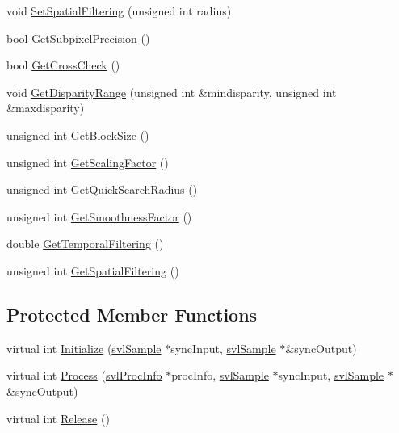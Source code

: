 \begin{DoxyCompactItemize}
\item 
void \hyperlink{classsvl_filter_computational_stereo_a1ff93f158c15c75f9bdbfbe3fc7f839f}{Set\-Spatial\-Filtering} (unsigned int radius)
\item 
bool \hyperlink{classsvl_filter_computational_stereo_a99fd778eca713298174b6de0b895472a}{Get\-Subpixel\-Precision} ()
\item 
bool \hyperlink{classsvl_filter_computational_stereo_a92734e4aeaefd2ac7555f193266c1c24}{Get\-Cross\-Check} ()
\item 
void \hyperlink{classsvl_filter_computational_stereo_a8a5e5d255fea88bb63a1e0f97671506f}{Get\-Disparity\-Range} (unsigned int \&mindisparity, unsigned int \&maxdisparity)
\item 
unsigned int \hyperlink{classsvl_filter_computational_stereo_a7e16047fd86e63abff87eac0b97cae89}{Get\-Block\-Size} ()
\item 
unsigned int \hyperlink{classsvl_filter_computational_stereo_a6028560c488697bf211a293d25e08911}{Get\-Scaling\-Factor} ()
\item 
unsigned int \hyperlink{classsvl_filter_computational_stereo_a965355a595658463d900756c73d88df4}{Get\-Quick\-Search\-Radius} ()
\item 
unsigned int \hyperlink{classsvl_filter_computational_stereo_a48a1b020a3bc04bd71fdc8fcb34b7748}{Get\-Smoothness\-Factor} ()
\item 
double \hyperlink{classsvl_filter_computational_stereo_a4cbc718032c81abe02fd8b8e81098750}{Get\-Temporal\-Filtering} ()
\item 
unsigned int \hyperlink{classsvl_filter_computational_stereo_ab59410ceb3d767f1f191edfed777bd30}{Get\-Spatial\-Filtering} ()
\end{DoxyCompactItemize}
\subsection*{Protected Member Functions}
\begin{DoxyCompactItemize}
\item 
virtual int \hyperlink{classsvl_filter_computational_stereo_a7f1dc5d6963c9dd69d8b99e672162909}{Initialize} (\hyperlink{classsvl_sample}{svl\-Sample} $\ast$sync\-Input, \hyperlink{classsvl_sample}{svl\-Sample} $\ast$\&sync\-Output)
\item 
virtual int \hyperlink{classsvl_filter_computational_stereo_ad2c3c7152f7bc9b3c4f59607071754d1}{Process} (\hyperlink{structsvl_proc_info}{svl\-Proc\-Info} $\ast$proc\-Info, \hyperlink{classsvl_sample}{svl\-Sample} $\ast$sync\-Input, \hyperlink{classsvl_sample}{svl\-Sample} $\ast$\&sync\-Output)
\item 
virtual int \hyperlink{classsvl_filter_computational_stereo_ad575ae786cce065ca19c01f536ca4d97}{Release} ()
\end{DoxyCompactItemize}
